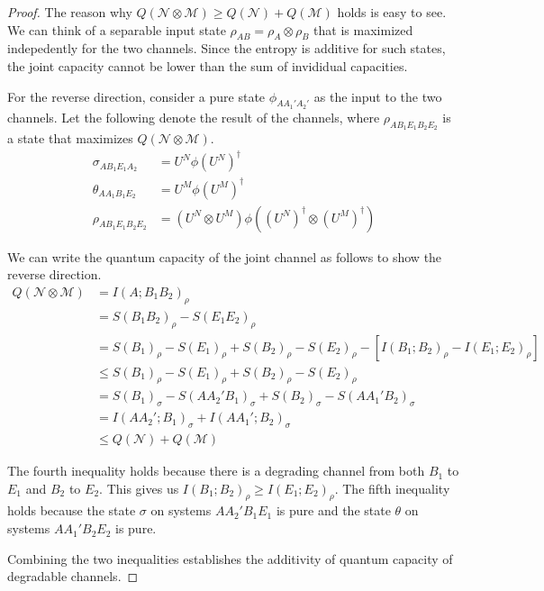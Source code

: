 \begin{proof}
The reason why $Q(\mathcal{N} \otimes \mathcal{M}) \geq Q(\mathcal{N}) + Q(\mathcal{M})$ holds is easy to see. We can think of a separable input state $\rho_{AB} = \rho_A \otimes \rho_B$ that is maximized indepedently for the two channels. Since the entropy is additive for such states, the joint capacity cannot be lower than the sum of invididual capacities. 

For the reverse direction, consider a pure state $\phi_{AA_1'A_2'}$ as the input to the two channels. Let the following denote the result of the channels, where $\rho_{AB_{1}E_{1}B_{2}E_{2}}$ is a state that maximizes $Q(\mathcal{N} \otimes \mathcal{M})$.
\begin{align*}
\sigma_{AB_{1}E_{1}A_{2}} &= U^{N} \phi (U^{N})^{\dagger} \\
\theta_{AA_{1}B_{1}E_{2}} &= U^{M} \phi (U^{M})^{\dagger} \\
\rho_{AB_{1}E_{1}B_{2}E_{2}} &= (U^{N} \otimes U^{M}) \phi ((U^{N})^{\dagger} \otimes (U^{M})^{\dagger})
\end{align*}

We can write the quantum capacity of the joint channel as follows to show the reverse direction.
\begin{align*}
Q(\mathcal{N} \otimes \mathcal{M}) &= I(A;B_1B_2)_{\rho} \\
&= S(B_1B_2)_{\rho} - S(E_1E_2)_{\rho} \\
&= S(B_1)_{\rho} - S(E_1)_{\rho} + S(B_2)_{\rho} - S(E_2)_{\rho} - [I(B_1;B_2)_{\rho} - I(E_1;E_2)_{\rho}] \\
&\leq S(B_1)_{\rho} - S(E_1)_{\rho} + S(B_2)_{\rho} - S(E_2)_{\rho} \\
&= S(B_1)_{\sigma} - S(AA_2'B_1)_{\sigma} + S(B_2)_{\sigma} - S(AA_1'B_2)_{\sigma} \\
&= I(AA_2';B_1)_{\sigma} + I(AA_1';B_2)_{\sigma} \\
&\leq Q(\mathcal{N}) + Q(\mathcal{M})
\end{align*}

The fourth inequality holds because there is a degrading channel from both $B_1$ to $E_1$ and $B_2$ to $E_2$. This gives us $I(B_1; B_2)_\rho \geq I(E_1; E_2)_\rho$. The fifth inequality holds because the state $\sigma$ on systems $AA_2'B_1E_1$ is pure and the state $\theta$ on systems $AA_1'B_2E_2$ is pure.

Combining the two inequalities establishes the additivity of quantum capacity of degradable channels.
\end{proof}


